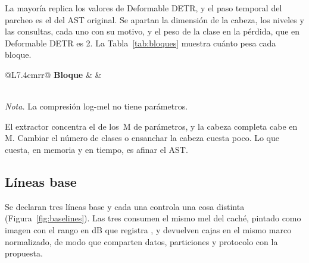La mayoría replica los valores de Deformable DETR, y el paso temporal del parcheo
es el del AST original. Se apartan la dimensión de la cabeza, los niveles y las
consultas, cada uno con su motivo, y el peso de la clase en la pérdida, que en
Deformable DETR es 2. La Tabla~\ref{tab:bloques} muestra cuánto pesa cada
bloque.

\begin{table}[htbp]
    \centering
    \small
    \begin{threeparttable}
        \caption{Parámetros por bloque}
        \label{tab:bloques}
        \begin{tabular}{@{}L{7.4cm}rr@{}}
            \toprule
            \textbf{Bloque} &  &  \\
            \midrule
             \\
            \bottomrule
        \end{tabular}
        \begin{tablenotes}[flushleft]
            \footnotesize
            \item \textit{Nota.} La compresión log-mel no tiene parámetros.
        \end{tablenotes}
    \end{threeparttable}
\end{table}

El extractor concentra el \mParamsBackbonePct{} de los \mParams{}\,M de
parámetros, y la cabeza completa cabe en \mParamsHead{}\,M. Cambiar el número de
clases o ensanchar la cabeza cuesta poco. Lo que cuesta, en memoria y en tiempo,
es afinar el AST.

\subsection{Líneas base}
\label{sec:baselines}

Se declaran tres líneas base y cada una controla una cosa distinta
(Figura~\ref{fig:baselines}). Las tres consumen el mismo mel del caché, pintado
como imagen con el rango en dB que registra , y devuelven cajas
en el mismo marco normalizado, de modo que comparten datos, particiones y
protocolo con la propuesta.

